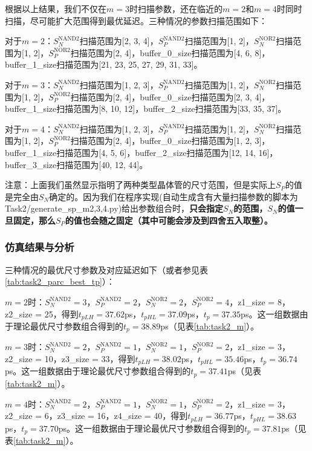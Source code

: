 \documentclass[UTF8,12pt,a4paper]{ctexart}
\begin{document}
根据以上结果，我们不仅在$m = 3$时扫描参数，还在临近的$m = 2$和$m = 4$时同时扫描，尽可能扩大范围得到最优延迟。三种情况的参数扫描范围如下：

对于$m = 2$：$S_N^{\text{NAND2}}$扫描范围为[2, 3, 4]，$S_P^{\text{NAND2}}$扫描范围为[1, 2]，$S_N^{\text{NOR2}}$扫描范围为[1, 2]，$S_P^{\text{NOR2}}$扫描范围为[2, 4]，buffer\_0\_size扫描范围为[4, 6, 8]，buffer\_1\_size扫描范围为[21, 23, 25, 27, 29, 31, 33]。

对于$m = 3$：$S_N^{\text{NAND2}}$扫描范围为[1, 2, 3]，$S_P^{\text{NAND2}}$扫描范围为[1, 2]，$S_N^{\text{NOR2}}$扫描范围为[1, 2]，$S_P^{\text{NOR2}}$扫描范围为[2, 4]，buffer\_0\_size扫描范围为[2, 3, 4]，buffer\_1\_size扫描范围为[8, 10, 12]，buffer\_2\_size扫描范围为[33, 35, 37]。

对于$m = 4$：$S_N^{\text{NAND2}}$扫描范围为[1, 2, 3]，$S_P^{\text{NAND2}}$扫描范围为[1, 2]，$S_N^{\text{NOR2}}$扫描范围为[1, 2]，$S_P^{\text{NOR2}}$扫描范围为[2, 4]，buffer\_0\_size扫描范围为[1, 2, 3]，buffer\_1\_size扫描范围为[4, 5, 6]，buffer\_2\_size扫描范围为[12, 14, 16]，buffer\_3\_size扫描范围为[40, 12, 44]。

注意：上面我们虽然显示指明了两种类型晶体管的尺寸范围，但是实际上$S_P$的值是完全由$S_N$确定的。因为我们在程序实现(自动生成含有大量扫描参数的脚本为Task2/generate\_sp\_m2,3,4.py)给出参数组合时，\textbf{只会指定$S_N$的范围，$S_N$的值一旦固定，那么$S_P$的值也会随之固定（其中可能会涉及到四舍五入取整）。}

\subsubsection{仿真结果与分析}

三种情况的最优尺寸参数及对应延迟如下（或者参见表\ref{tab:task2_parc_best_tp}）：

$m = 2$时：$S_N^{\text{NAND2}} = 3$，$S_P^{\text{NAND2}} = 2$，$S_N^{\text{NOR2}} = 2$，$S_P^{\text{NOR2}} = 4$，z1\_size = 8，z2\_size = 25，得到$t_{pLH} = 37.62$ps，$t_{pHL} = 37.09$ps，$t_p = 37.35$ps。这一组数据由于理论最优尺寸参数组合得到的$t_p=38.89$ps（见表\ref{tab:task2_m}）。

$m = 3$时：$S_N^{\text{NAND2}} = 2$，$S_P^{\text{NAND2}} = 1$，$S_N^{\text{NOR2}} = 1$，$S_P^{\text{NOR2}} = 2$，z1\_size = 3，z2\_size = 10，z3\_size = 33，得到$t_{pLH} = 38.02$ps，$t_{pHL} = 35.46$ps，$t_p = 36.74$ps。这一组数据由于理论最优尺寸参数组合得到的$t_p=37.41$ps（见表\ref{tab:task2_m}）。

$m = 4$时：$S_N^{\text{NAND2}} = 2$，$S_P^{\text{NAND2}} = 1$，$S_N^{\text{NOR2}} = 1$，$S_P^{\text{NOR2}} = 2$，z1\_size = 3，z2\_size = 6，z3\_size = 16，z4\_size = 40，得到$t_{pLH} = 36.77$ps，$t_{pHL} = 38.63$ps，$t_p = 37.70$ps。这一组数据由于理论最优尺寸参数组合得到的$t_p=37.81$ps（见表\ref{tab:task2_m}）。
\end{document}
